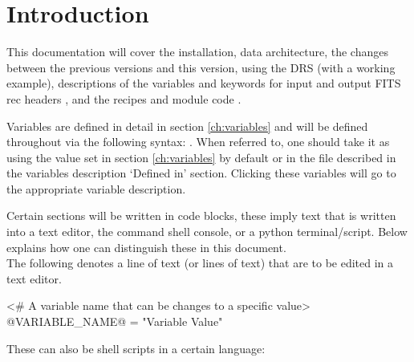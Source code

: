 \chapter{Introduction}
\label{chapter:intro}

This documentation will cover the installation, data architecture, \ifdevguide the changes between the previous versions and this version\fi, using the DRS (with a working example), descriptions of the variables \ifdevguide and keywords for input and output FITS rec headers \fi, and the recipes \ifdevguide and module code \fi.

\noindent Variables are defined in detail in section \ref{ch:variables} and will be defined throughout via the following syntax: . When referred to, one should take it as using the value set in section \ref{ch:variables} by default or in the file described in the variables description `Defined in' section. Clicking these variables will go to the appropriate variable description.

\noindent Certain sections will be written in code blocks, these imply text that is written into a text editor, the command shell console, or a python terminal/script. Below explains how one can distinguish these in this document. \\

\noindent The following denotes a line of text (or lines of text) that are to be edited in a text editor.
\begin{textbox}[title={Generic text file}]
<# A variable name that can be changes to a specific value>
@VARIABLE_NAME@ = "Variable Value"
\end{textbox}
\vspace{0.5cm}

\noindent These can also be shell scripts in a certain language:
\vspace{0.5cm}

